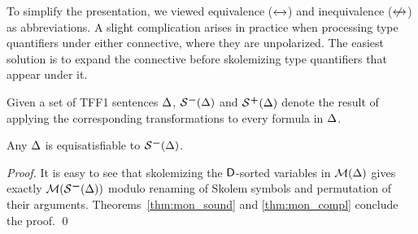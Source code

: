 To simplify the presentation, we viewed equivalence ($\leftarrow\kern-1.75ex\rightarrow$) and inequivalence
($\kern.4875ex\not\kern-.4875ex\leftarrow\kern-1.75ex\rightarrow$) as abbreviations. A slight complication arises in practice when
processing type quantifiers under either connective, where they are unpolarized.
The easiest solution is to expand the connective before
skolemizing type quantifiers that appear under it.


Given a set of TFF1 sentences $\mathrm{\Delta}$,
$\SKOM(\DEL)$ and $\mathcal{S}\text{\textsuperscript{\kern.1ex\bfseries+}}(\mathrm{\Delta})$ denote the result of applying
the corresponding transformations to every formula in $\mathrm{\Delta}$.

\begin{theorem} \label{thm:sko}
Any\/ $\mathrm{\Delta}$ is equisatisfiable to $\SKOM(\DEL)$.
\end{theorem}
\begin{proof}
It is easy to see that
skolemizing the $\mathsf{D}$-sorted variables in $\mathcal{M}(\mathrm{\Delta})$ gives
exactly $\MON(\SKOM(\DEL))$ modulo renaming of Skolem symbols and
permutation of their arguments. Theorems~\ref{thm:mon_sound} and
\ref{thm:mon_compl} conclude the proof.
\qed
\end{proof}

%

